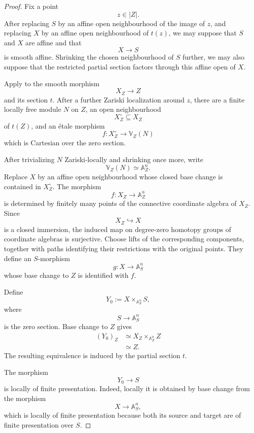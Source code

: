 \begin{proof}
Fix a point
\[
    z\in|Z|.
\]
After replacing \(S\) by an affine open neighbourhood of the image of
\(z\), and replacing \(X\) by an affine open neighbourhood of \(t(z)\),
we may suppose that \(S\) and \(X\) are affine and that
\[
    X
    \longrightarrow
    S
\]
is smooth affine.  Shrinking the chosen neighbourhood of \(S\)
further, we may also suppose that the restricted partial section
factors through this affine open of \(X\).

Apply
to the smooth morphism
\[
    X_Z
    \longrightarrow
    Z
\]
and its section \(t\).  After a further Zariski localization around
\(z\), there are a finite locally free module \(N\) on \(Z\), an open
neighbourhood
\[
    X_Z^\circ
    \subseteq
    X_Z
\]
of \(t(Z)\), and an étale morphism
\[
    f
    \colon
    X_Z^\circ
    \longrightarrow
    \mathbb V_Z(N)
\]
which is Cartesian over the zero section.

After trivializing \(N\) Zariski-locally and shrinking once more, write
\[
    \mathbb V_Z(N)
    \simeq
    \mathbb A_Z^n.
\]
Replace \(X\) by an affine open neighbourhood whose closed base change
is contained in \(X_Z^\circ\).  The morphism
\[
    f
    \colon
    X_Z
    \longrightarrow
    \mathbb A_Z^n
\]
is determined by finitely many points of the connective coordinate
algebra of \(X_Z\).  Since
\[
    X_Z
    \hookrightarrow
    X
\]
is a closed immersion, the induced map on degree-zero homotopy groups
of coordinate algebras is surjective.  Choose lifts of the
corresponding components, together with paths identifying their
restrictions with the original points.  They define an \(S\)-morphism
\[
    g
    \colon
    X
    \longrightarrow
    \mathbb A_S^n
\]
whose base change to \(Z\) is identified with \(f\).

Define
\[
    Y_0
    :=
    X\times_{\mathbb A_S^n}S,
\]
where
\[
    S
    \longrightarrow
    \mathbb A_S^n
\]
is the zero section.  Base change to \(Z\) gives
\[
\begin{aligned}
    (Y_0)_Z
    &\simeq
    X_Z\times_{\mathbb A_Z^n}Z
    \\
    &\simeq
    Z.
\end{aligned}
\]
The resulting equivalence is induced by the partial section \(t\).

The morphism
\[
    Y_0
    \longrightarrow
    S
\]
is locally of finite presentation.  Indeed, locally it is obtained by
base change from the morphism
\[
    X
    \longrightarrow
    \mathbb A_S^n,
\]
which is locally of finite presentation because both its source and
target are of finite presentation over \(S\).


\end{proof}
